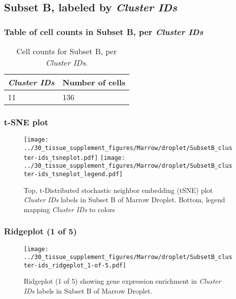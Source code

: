 \clearpage

\subsection{Subset B, labeled by \emph{Cluster IDs}}
\subsubsection{Table of cell counts in Subset B, per \emph{Cluster IDs}}\begin{table}[h]
\centering
\label{my-label}
\begin{tabular}{@{}ll@{}}
\toprule

\emph{Cluster IDs}& Number of cells \\ \midrule
11 & 136 \\
\bottomrule
\end{tabular}
\caption{Cell counts for Subset B, per \emph{Cluster IDs}.}
\end{table}

\clearpage
\subsubsection{t-SNE plot}
\begin{figure}[h]
\centering
\texttt{[image: ../30\_tissue\_supplement\_figures/Marrow/droplet/SubsetB\_cluster-ids\_tsneplot.pdf]}
\texttt{[image: ../30\_tissue\_supplement\_figures/Marrow/droplet/SubsetB\_cluster-ids\_tsneplot\_legend.pdf]}
\caption{Top, t-Distributed stochastic neighbor embedding (tSNE) plot  \emph{Cluster IDs} labels in Subset B of Marrow Droplet. Bottom, legend mapping \emph{Cluster IDs} to colors}
\end{figure}


\clearpage

\subsubsection{Ridgeplot (1 of 5)}
\begin{figure}[h]
\centering
\texttt{[image: ../30\_tissue\_supplement\_figures/Marrow/droplet/SubsetB\_cluster-ids\_ridgeplot\_1-of-5.pdf]}

\caption{ Ridgeplot (1 of 5)  showing gene expression enrichment in \emph{Cluster IDs} labels in Subset B of Marrow Droplet. }
\end{figure}


\clearpage

